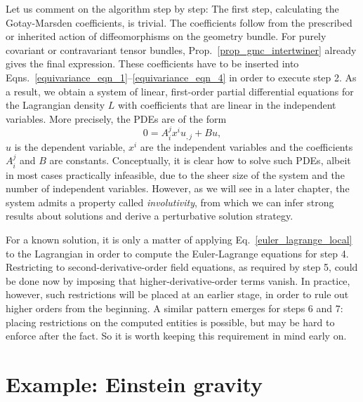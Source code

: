 Let us comment on the algorithm step by step: The first step, calculating the Gotay-Marsden coefficients, is trivial. The coefficients follow from the prescribed or inherited action of diffeomorphisms on the geometry bundle. For purely covariant or contravariant tensor bundles, Prop.~\ref{prop_gmc_intertwiner} already gives the final expression. These coefficients have to be inserted into Eqns.~\ref{equivariance_eqn_1}--\ref{equivariance_eqn_4} in order to execute step 2. As a result, we obtain a system of linear, first-order partial differential equations for the Lagrangian density $L$ with coefficients that are linear in the independent variables. More precisely, the PDEs are of the form
\begin{equation}
  0 = A^j_i x^i u_{,j} + B u,
\end{equation}
$u$ is the dependent variable, $x^i$ are the independent variables and the coefficients $A^j_i$ and $B$ are constants. Conceptually, it is clear how to solve such PDEs\cite{seiler}, albeit in most cases practically infeasible, due to the sheer size of the system and the number of independent variables. However, as we will see in a later chapter, the system admits a property called \emph{involutivity}, from which we can infer strong results about solutions and derive a perturbative solution strategy.

For a known solution, it is only a matter of applying Eq.~\ref{euler_lagrange_local} to the Lagrangian in order to compute the Euler-Lagrange equations for step 4. Restricting to second-derivative-order field equations, as required by step 5, could be done now by imposing that higher-derivative-order terms vanish. In practice, however, such restrictions will be placed at an earlier stage, in order to rule out higher orders from the beginning. A similar pattern emerges for steps 6 and 7: placing restrictions on the computed entities is possible, but may be hard to enforce after the fact. So it is worth keeping this requirement in mind early on.

\section{Example: Einstein gravity}

